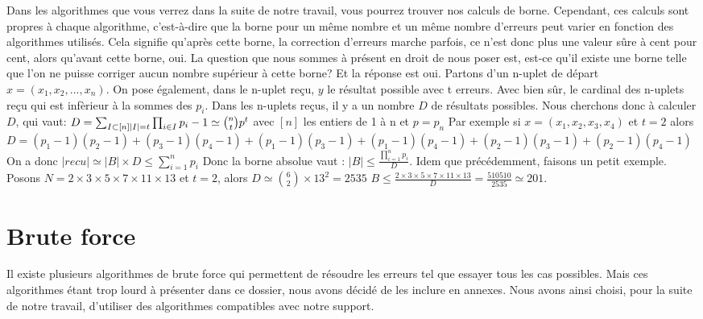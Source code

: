 \documentclass[a4paper, 11pt]{report}
\begin{document}
Dans les algorithmes que vous verrez dans la suite de notre travail, vous pourrez trouver nos calculs de borne. Cependant, ces calculs sont propres à chaque algorithme,
c'est-à-dire que la borne pour un même nombre et un même nombre d'erreurs peut varier en fonction des algorithmes utilisés. \newline
Cela signifie qu'après cette borne, la correction d'erreurs marche parfois, ce n'est donc plus une valeur sûre à cent pour cent, alors qu'avant cette borne, oui.
\newline
La question que nous sommes à présent en droit de nous poser est, est-ce qu'il existe une borne telle que l'on ne puisse corriger aucun nombre supérieur à cette borne? Et la réponse est oui.
Partons d'un n-uplet de départ $x=(x_1, x_2, ..., x_n)$. On pose également, dans le n-uplet reçu, $y$ le résultat possible avec t erreurs. Avec bien sûr, le cardinal des n-uplets reçu qui est infèrieur à la sommes des $p_i$. Dans les n-uplets reçus, il y a un nombre $D$ de résultats possibles. Nous cherchons donc à calculer $D$, qui vaut: \newline
$D=\sum_{I \subset  [n]  \newline |I|=t  }  \prod _{i \in I} p_i - 1 \simeq  \binom{n}{t} p^t  $ avec $[n]$ les entiers de 1 à n et $p=p_n$\newline
Par exemple si $x=(x_1, x_2, x_3, x_4)$ et $t=2$ alors $D=(p_1-1)(p_2-1)+(p_3-1)(p_4-1)+(p_1-1)(p_3-1)+(p_1-1)(p_4-1)+(p_2-1)(p_3-1)+(p_2-1)(p_4-1)$ \newline
On a donc $ |recu| \simeq |B| \times D\leq \sum_{i = 1}^{n} p_i  $ \newline
Donc la borne absolue vaut : $|B| \leq  \frac{\prod_{i= 1}^{n} p_i }{D} $.\newline
Idem que précédemment, faisons un petit exemple. \newline
Posons $N=2\times 3\times 5\times 7\times 11\times 13$ et $t=2$, alors $D\simeq \binom{6}{2}\times 13^2=2535$
$B \leq  \frac{2\times 3\times 5\times 7\times 11\times 13}{D}=\frac{510510}{2535} \simeq 201 $.


\newpage

\chapter{Brute force}

Il existe plusieurs algorithmes de brute force qui permettent de résoudre les erreurs tel que essayer tous les cas possibles. Mais ces algorithmes étant trop lourd à présenter dans ce dossier, nous avons décidé de les inclure en annexes.
Nous avons ainsi choisi, pour la suite de notre travail, d'utiliser des algorithmes compatibles avec notre support.
\end{document}
